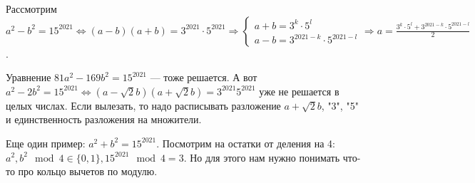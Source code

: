 Рассмотрим $a^2 - b^2 = 15^{2021} \iff (a-b)(a + b) = 3^{2021} \cdot 5^{2021} \Rightarrow \begin{cases} a+b=3^k \cdot 5^l \\ a-b=3^{2021-k} \cdot 5^{2021-l} \end{cases} \Rightarrow a = \frac{3^k \cdot 5^l + 3^{2021-k} \cdot 5^{2021-l}}{2}$.  

Уравнение $81a^2-169b^2=15^{2021}$ --- тоже решается. А вот $a^2-2b^2 = 15^{2021} \iff (a-\sqrt{2}b)(a+\sqrt{2}b) = 3^{2021}5^{2021}$ уже не решается в целых числах. Если вылезать, то надо расписывать разложение $a+\sqrt{2}b$, "3", "5" и единственность разложения на множители.

Еще один пример:  $a^2+b^2=15^{2021}$. Посмотрим на остатки от деления на 4:  $a^2, b^2 \mod 4 \in \{0, 1\}, 15^{2021} \mod 4 = 3$. Но для этого нам нужно понимать что-то про кольцо вычетов по модулю.

